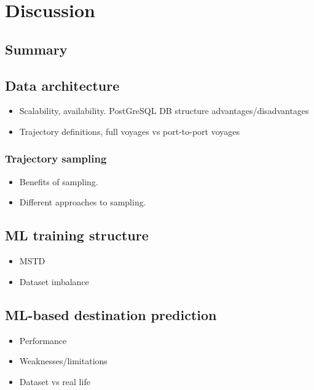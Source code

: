\chapter{Discussion}

\section{Summary}

\section{Data architecture}

\begin{itemize}
    \item Scalability, availability. PostGreSQL DB structure advantages/disadvantages
    \item Trajectory definitions, full voyages vs port-to-port voyages
\end{itemize}

\subsection{Trajectory sampling}

\begin{itemize}
    \item Benefits of sampling.
    \item Different approaches to sampling.
\end{itemize}

\section{ML training structure}

\begin{itemize}
    \item MSTD
    \item Dataset imbalance
\end{itemize}

\section{ML-based destination prediction}

\begin{itemize}
    \item Performance
    \item Weaknesses/limitations
    \item Dataset vs real life
\end{itemize}

